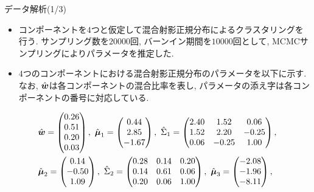 \documentclass[dvipdfmx]{beamer} %
\newcommand{\bm}[1]{\mbox{\boldmath $#1$}}
\begin{document}
\begin{frame}{データ解析(1/3)}

\begin{itemize}
	\item 
	コンポーネントを$4$つと仮定して混合射影正規分布によるクラスタリングを行う. サンプリング数を$20000$回, バーンイン期間を$10000$回として, MCMCサンプリングによりパラメータを推定した.
	\vspace{0.2cm}
	\item
	$4$つのコンポーネントにおける混合射影正規分布のパラメータを以下に示す. なお, $\hat {\bm w}$は各コンポーネントの混合比率を表し, パラメータの添え字は各コンポーネントの番号に対応している.
\end{itemize}
 
\vspace{-0.2cm}
\footnotesize %
\begin{equation*}
\begin{split}
&\hat {\bm w} = \begin{pmatrix} 0.26 \\ 0.51 \\ 0.20 \\ 0.03 \\ \end{pmatrix},\ 
\hat{\bm \mu}_1 = \begin{pmatrix} 0.44 \\ 2.85 \\ -1.67 \\ \end{pmatrix},\ 
\hat \Sigma_1 = \begin{pmatrix}  2.40 & 1.52 &  0.06 \\ 1.52 & 2.20 & -0.25 \\ 0.06 & -0.25 &1.00 \\ \end{pmatrix},\\ 
&\hat{\bm \mu}_2 = \begin{pmatrix} 0.14 \\ -0.50 \\ 1.09 \\ \end{pmatrix},\ 
\hat \Sigma_2 = \begin{pmatrix}   0.28  & 0.14 &  0.20 \\ 0.14 & 0.61 & 0.06 \\  0.20 & 0.06 &1.00 \\ \end{pmatrix},\ 
\hat{\bm \mu}_3 = \begin{pmatrix} -2.08  \\ -1.96 \\ -8.11 \\ \end{pmatrix},\\ 

\end{split}
\end{equation*}
\end{frame}
\end{document}
